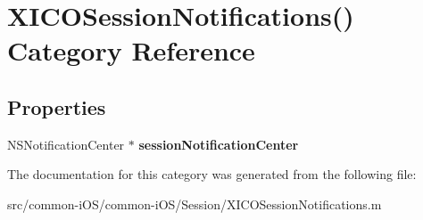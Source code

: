 \hypertarget{category_x_i_c_o_session_notifications_07_08}{}\section{X\+I\+C\+O\+Session\+Notifications() Category Reference}
\label{category_x_i_c_o_session_notifications_07_08}
\subsection*{Properties}
\begin{DoxyCompactItemize}
\item 
\hypertarget{category_x_i_c_o_session_notifications_07_08_ace4e0f056fc692aad91a27aaedf5c5c1}{}\label{category_x_i_c_o_session_notifications_07_08_ace4e0f056fc692aad91a27aaedf5c5c1} 
N\+S\+Notification\+Center $\ast$ {\bfseries session\+Notification\+Center}
\end{DoxyCompactItemize}


The documentation for this category was generated from the following file\+:\begin{DoxyCompactItemize}
\item 
src/common-\/i\+O\+S/common-\/i\+O\+S/\+Session/X\+I\+C\+O\+Session\+Notifications.\+m\end{DoxyCompactItemize}
